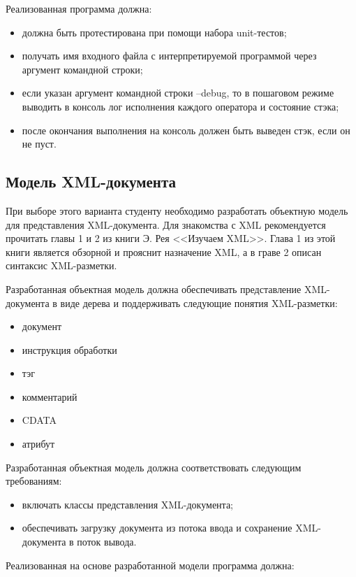 \documentclass[a4paper,12pt]{article}
\begin{document}
Реализованная программа должна:

\begin{itemize}
\item должна быть протестирована при помощи набора unit-тестов;
\item получать имя входного файла с интерпретируемой программой через
  аргумент командной строки;
\item если указан аргумент командной строки –debug, то в пошаговом режиме
  выводить в консоль лог исполнения каждого оператора и состояние
  стэка;
\item после окончания выполнения на консоль должен быть выведен стэк,
  если он не пуст.
\end{itemize}

\subsection{Модель XML-документа}

При выборе этого варианта студенту необходимо разработать объектную
модель для представления XML-документа. Для знакомства с XML
рекомендуется прочитать главы 1 и 2 из книги Э. Рея <<Изучаем
XML>>. Глава 1 из этой книги является обзорной и прояснит назначение
XML, а в граве 2 описан синтаксис XML-разметки.

Разработанная объектная модель должна обеспечивать представление
XML-документа в виде дерева и поддерживать следующие понятия
XML-разметки:

\begin{itemize}
\item документ
\item инструкция обработки
\item тэг
\item комментарий
\item CDATA
\item атрибут
\end{itemize}

Разработанная объектная модель должна соответствовать следующим требованиям: 

\begin{itemize}
\item включать классы представления XML-документа;
\item обеспечивать загрузку документа из потока ввода и сохранение
  XML-документа в поток вывода.
\end{itemize}

Реализованная на основе разработанной модели программа должна: 
\end{document}
